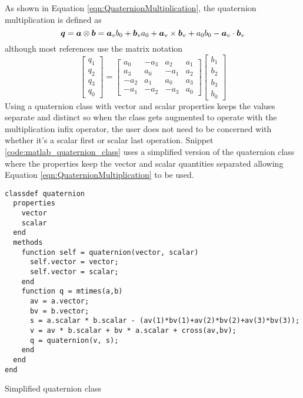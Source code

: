 As shown in Equation \ref{eqn:QuaternionMultiplication}, the quaternion multiplication is defined as
\begin{equation}
  \boldsymbol{q} = \boldsymbol{a} \otimes \boldsymbol{b} = \boldsymbol{a}_v b_0 + \boldsymbol{b}_v a_0 + \boldsymbol{a}_v \times \boldsymbol{b}_v + a_0 b_0 - \boldsymbol{a}_v \cdot \boldsymbol{b}_v
\end{equation}
although most references use the matrix notation
\begin{equation}
  \begin{bmatrix} q_1 \\ q_2 \\ q_3 \\ q_0 \end{bmatrix} =
  \begin{bmatrix}
    a_0 & - a_3 &   a_2 & a_1 \\
    a_3 &   a_0 & - a_1 & a_2 \\
  - a_2 &   a_1 &   a_0 & a_3 \\
  - a_1 & - a_2 & - a_3 & a_0
  \end{bmatrix}
  \begin{bmatrix}
  b_1 \\ b_2 \\ b_3 \\ b_0
  \end{bmatrix}
\end{equation}
Using a quaternion class with vector and scalar properties keeps the values separate and distinct so when the class gets augmented to operate with the multiplication infix operator, the user does not need to be concerned with whether it's a scalar first or scalar last operation.
Snippet \ref{code:matlab_quaternion_class} uses a simplified version of the quaternion class where the properties keep the vector and scalar quantities
separated allowing Equation \ref{eqn:QuaternionMultiplication} to be used.
\begin{listing}[H]
\begin{singlespace}
  \begin{verbatim}
classdef quaternion
  properties
    vector
    scalar
  end
  methods
    function self = quaternion(vector, scalar)
      self.vector = vector;
      self.vector = scalar;
    end
    function q = mtimes(a,b)
      av = a.vector;
      bv = b.vector;
      s = a.scalar * b.scalar - (av(1)*bv(1)+av(2)*bv(2)+av(3)*bv(3));
      v = av * b.scalar + bv * a.scalar + cross(av,bv);
      q = quaternion(v, s);
    end
  end
end
  \end{verbatim}
\caption{Simplified quaternion class}
\label{code:matlab_quaternion_class}
\nocite{minted}
\end{singlespace}
\end{listing}

